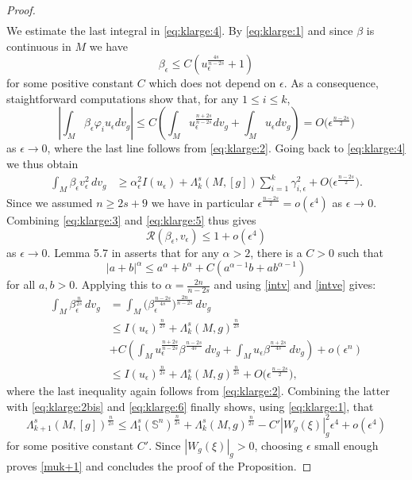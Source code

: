 \documentclass[10pt]{amsart}
\numberwithin{equation}{section}
\def\al{{\alpha}}
\def\La{{\Lambda}}
\def\be{{\beta}}
\def\ep{{\varepsilon}}
\newcommand{\vp}{\varphi}
\def \ep{\epsilon}
\theoremstyle{plain}
\theoremstyle{remark}
\begin{document}
\begin{proof}
\begin{equation}
\begin{aligned}
\end{aligned}
\end{equation}
We estimate the last integral in \eqref{eq:klarge:4}. By \eqref{eq:klarge:1} and since $\beta$ is continuous in $M$ we have 
$$\beta_\ep  \leq C (u_\ep^{\frac{4s}{n-2s}} +1)$$
for some positive constant $C$ which does not depend on $\ep$. As a consequence, staightforward computations show that, for any $1 \le i \le k$,  
$$\left| \int_M \beta_\ep \vp_i u_\ep dv_g \right| \leq C \left( \int_M u_\ep^{\frac{n+2s}{n-2s}} dv_g + \int_M u_\ep dv_g  \right) = O  \big(\ep^{\frac{n-2s}{2}} \big) $$
as $\ep \to 0$, where the last line follows from \eqref{eq:klarge:2}. Going back to \eqref{eq:klarge:4} we thus obtain
\begin{equation}   \label{eq:klarge:5}
\begin{aligned}
\int_M \beta_\ep v_\ep^2  \,dv_g & \geq \al_\ep^2 I(u_\ep)  + \La_k^s(M,[g]) \sum_{i=1}^k \gamma_{i,\ep}^2 + O  \big(\ep^{\frac{n-2s}{2}} \big).
\end{aligned}
\end{equation}
Since we assumed $n \ge 2s+9$ we have in particular $\ep^{\frac{n-2s}{2}}  = o(\ep^4)$ as $\ep \to 0$. Combining \eqref{eq:klarge:3} and \eqref{eq:klarge:5} thus gives 
\begin{equation} \label{eq:klarge:6}
 \mathcal{R}(\beta_\ep, v_\ep)\le 1 + o(\ep^4)
 \end{equation}
as $\ep \to 0$.  
Lemma 5.7 in \cite{AmmannHumbert} asserts that for any $\al>2$, there is a  $C >0$ such that 
$$|a+b|^{\al} \leq a^{\al} + b^{\al} + C ( a^{\al -1}b  +  a b^{\al -1})$$
for all $a,b >0$. Applying this to $\alpha = \frac{2n}{n-2s}$ and using \eqref{intv} and \eqref{intve} gives:   
$$ \begin{aligned} 
 \int_M \be_\ep^{\frac{n}{2s}} \,dv_g &= \int_M \big(\be_\ep^{\frac{n-2s}{4s}}\big)^{\frac{2n}{n-2s}} \,dv_g \\
& \leq  I(u_{\ep})^{\frac{n}{2s}}  + \La_k^s(M,g)^{\frac{n}{2s}}  \\ 
&  + C  \left(\int_M u_{\ep}^{\frac{n+2s}{n-2s}} \beta^{\frac{n-2s}{4s}} \,dv_g + \int_M u_{\ep}\beta^{\frac{n+2s}{4s}}
   \,dv_g \right) +o(\ep^n) \\
   & \le I(u_{\ep})^{\frac{n}{2s}}  + \La_k^s(M,g)^{\frac{n}{2s}} +  O  \big(\ep^{\frac{n-2s}{2}} \big),
\end{aligned}$$ 
where the last inequality again follows from \eqref{eq:klarge:2}. Combining the latter with \eqref{eq:klarge:2bis} and  \eqref{eq:klarge:6} finally shows, using \eqref{eq:klarge:1}, that 
$$ \La_{k+1}^s(M,[g])^{\frac{n}{2s}} \leq \Lambda_1^s(\mathbb{S}^n)^{\frac{n}{2s}} + \La_k^s(M,g)^{\frac{n}{2s}} - C' |W_g(\xi)|_g^2  \ep^4 +  o(\ep^4) $$
for some positive constant $C'$. Since $|W_g(\xi)|_g >0$, choosing $\ep$ small enough proves \eqref{muk+1} and concludes the proof of the Proposition.
\end{proof}
\end{document}
